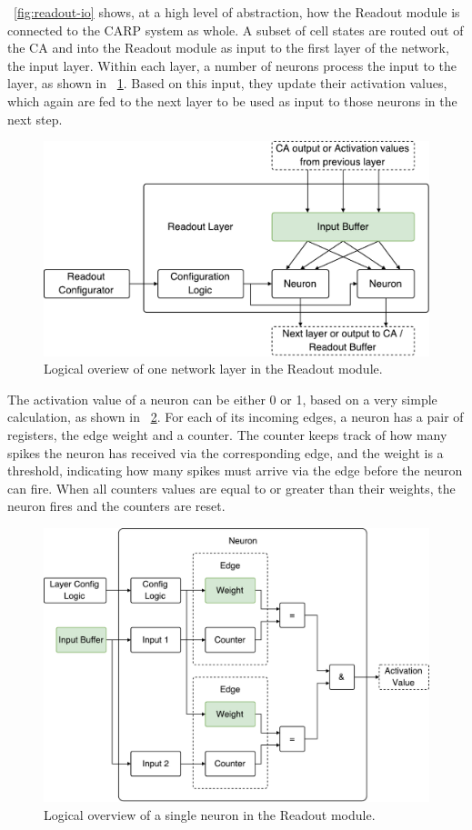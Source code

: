 \figurename~\ref{fig:readout-io} shows, at a high level of abstraction, how the
Readout module is connected to the CARP system as whole. A subset of cell states
are routed out of the CA and into the Readout module as input to the first layer
of the network, the input layer. Within each layer, a number of neurons process
the input to the layer, as shown in \figurename~\ref{fig:readout-layer}. Based
on this input, they update their activation values, which again are fed to the
next layer to be used as input to those neurons in the next step.

\begin{figure}[ht]
  \centering
  \includegraphics[width=0.8\linewidth]{fig/readout-layer}
  \caption{Logical overiew of one network layer in the Readout module.}
  \label{fig:readout-layer}
\end{figure}

The activation value of a neuron can be either 0 or 1, based on a very simple
calculation, as shown in \figurename~\ref{fig:readout-neuron}. For each of its
incoming edges, a neuron has a pair of registers, the edge weight and a counter.
The counter keeps track of how many spikes the neuron has received via the
corresponding edge, and the weight is a threshold, indicating how many spikes
must arrive via the edge before the neuron can fire. When all counters values
are equal to or greater than their weights, the neuron fires and the counters
are reset.

\begin{figure}[ht]
  \centering
  \includegraphics[width=0.8\linewidth]{fig/readout-neuron}
  \caption{Logical overview of a single neuron in the Readout module.}
  \label{fig:readout-neuron}
\end{figure}

